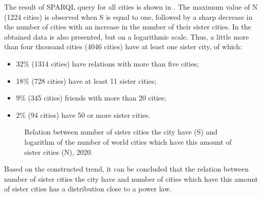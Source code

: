 The result of SPARQL query for all cities is shown in . The maximum value of N (\num{1224} cities) is observed when S is equal to one, followed by a sharp decrease in the number of cities with an increase in the number of their sister cities. In  the obtained data is also presented, but on a logarithmic scale. Thus, a little more than four thousand cities (4046 cities) have at least one sister city, of which:

\begin{itemize}
\item 32\% (1314 cities) have relations with more than five cities;
\item 18\% (728 cities) have at least 11 sister cities;
\item 9\% (345 cities) friends with more than 20 cities;
\item 2\% (94 cities) have 50 or more sister cities.
\end{itemize}

\begin{figure*}[h]
{
\setlength{\fboxsep}{0pt}%
\setlength{\fboxrule}{1pt}%
%
}
  \caption{Relation between number of sister cities the city have (S) and logarithm of the number of world cities which have this amount of sister cities (N), 2020.}%
\end{figure*}

Based on the constructed trend, it can be concluded that the relation between number of sister cities the city have and number of cities which have this amount of sister cities has a distribution close to a power law.

